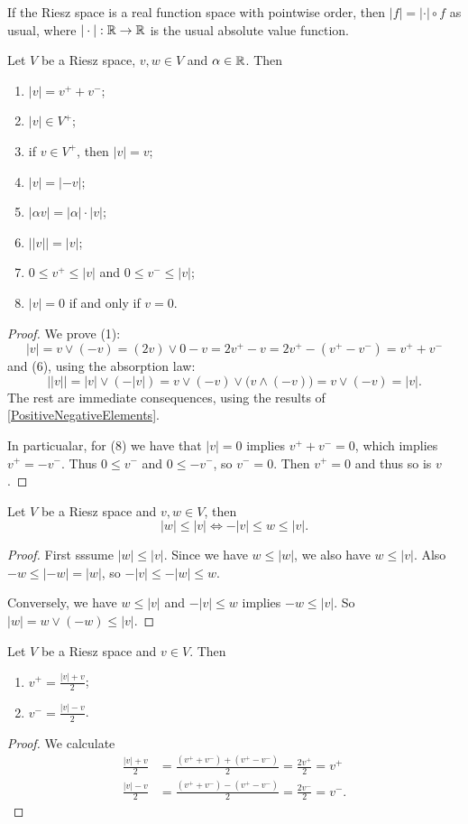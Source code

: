 If the Riesz space is a real function space with pointwise order, then $|f| = |\cdot|\circ f$ as usual, where $|\cdot|: \mathbb{R}\to \mathbb{R}$ is the usual absolute value function.

\begin{lemma} \label{absoluteValue}
Let $V$ be a Riesz space, $v,w\in V$ and $\alpha\in \mathbb{R}$. Then
\begin{enumerate}
\item $|v| = v^+ + v^-$;
\item $|v| \in V^+$;
\item if $v\in V^+$, then $|v| = v$;
\item $|v| = |-v|$;
\item $|\alpha v| = |\alpha|\cdot |v|$;
\item $\big||v|\big| = |v|$;
\item $0 \leq v^+ \leq |v|$ and $0 \leq v^- \leq |v|$;
\item $|v| = 0$ \textup{if and only if} $v = 0$.
\end{enumerate}
\end{lemma}
\begin{proof}
We prove (1):
\[ |v| = v\vee (-v) = (2v)\vee 0 - v = 2v^+ - v = 2v^+ - (v^+ - v^-) = v^+ + v^- \]
and (6), using the absorption law:
\[ \big||v|\big| = |v|\vee (-|v|) = v \vee (-v) \vee \big( v\wedge (-v) \big) = v \vee (-v) = |v|. \]
The rest are immediate consequences, using the results of \ref{PositiveNegativeElements}.

In particualar, for (8) we have that $|v|=0$ implies $v^+ + v^- = 0$, which implies $v^+ = -v^-$. Thus $0\leq v^-$ and $0\leq -v^-$, so $v^- = 0$. Then $v^+ = 0$ and thus so is $v$.
\end{proof}

\begin{lemma} \label{solidLemma}
Let $V$ be a Riesz space and $v,w\in V$, then
\[ |w|\leq |v| \iff -|v| \leq w \leq |v|. \]
\end{lemma}
\begin{proof}
First sssume $|w| \leq |v|$. Since we have $w \leq |w|$, we also have $w\leq |v|$. Also $-w \leq |-w| = |w|$, so $-|v| \leq -|w| \leq w$.

Conversely, we have $w\leq |v|$ and $-|v| \leq w$ implies $-w\leq |v|$. So $|w| = w\vee (-w) \leq |v|$.
\end{proof}

\begin{lemma} \label{positiveNegativePartAverage}
Let $V$ be a Riesz space and $v\in V$. Then
\begin{enumerate}
\item $\displaystyle v^+ = \frac{|v|+v}{2}$;
\item $\displaystyle v^- = \frac{|v|-v}{2}$.
\end{enumerate}
\end{lemma}
\begin{proof}
We calculate
\begin{align*}
\frac{|v|+v}{2} &= \frac{(v^+ + v^-) + (v^+ - v^-)}{2} = \frac{2v^+}{2} = v^+ \\
\frac{|v|-v}{2} &= \frac{(v^+ + v^-) - (v^+ - v^-)}{2} = \frac{2v^-}{2} = v^-.
\end{align*}
\end{proof}

